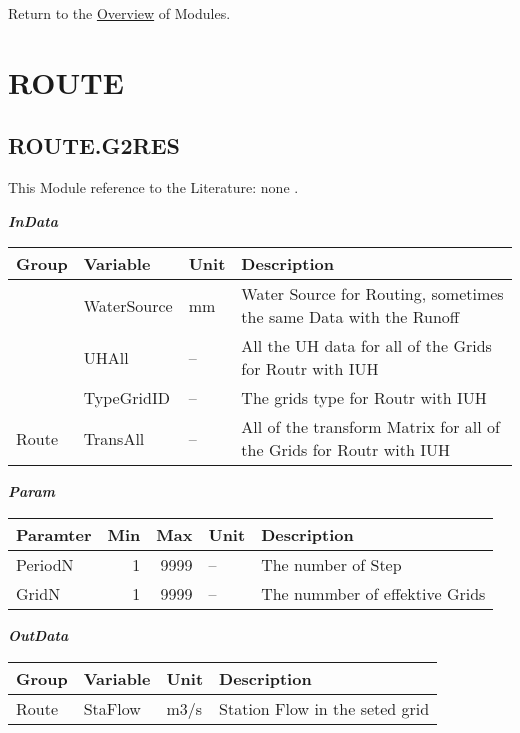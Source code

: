 \documentclass[
]{book}
\begin{document}
Return to the \protect\hyperlink{module}{Overview} of Modules.

\hypertarget{ROUTE}{%
\section{ROUTE}\label{ROUTE}}

\hypertarget{ROUTE.G2RES}{%
\subsection{ROUTE.G2RES}\label{ROUTE.G2RES}}

This Module reference to the Literature: none \citep{none}.

\textbf{\emph{InData}}

\begin{table}[!h]
\centering
\begin{tabular}{l|l|l|l}
\hline
Group & Variable & Unit & Description\\
\hline
 & WaterSource & mm & Water Source for Routing, sometimes the same Data with the Runoff\\
\cline{2-4}
 & UHAll & -- & All the UH data for all of the Grids for Routr with IUH\\
\cline{2-4}
 & TypeGridID & -- & The grids type for Routr with IUH\\
\cline{2-4}
\multirow{-4}{*}{\raggedright\arraybackslash Route} & TransAll & -- & All of the transform Matrix for all of the Grids for Routr with IUH\\
\hline
\end{tabular}
\end{table}

\textbf{\emph{Param}}

\begin{table}[!h]
\centering
\begin{tabular}{l|r|r|l|l}
\hline
Paramter & Min & Max & Unit & Description\\
\hline
PeriodN & 1 & 9999 & -- & The number of Step\\
\cline{1-5}
GridN & 1 & 9999 & -- & The nummber of effektive Grids\\
\hline
\end{tabular}
\end{table}

\textbf{\emph{OutData}}

\begin{table}[!h]
\centering
\begin{tabular}{l|l|l|l}
\hline
Group & Variable & Unit & Description\\
\hline
Route & StaFlow & m3/s & Station Flow in the seted grid\\
\hline
\end{tabular}
\end{table}
\end{document}
